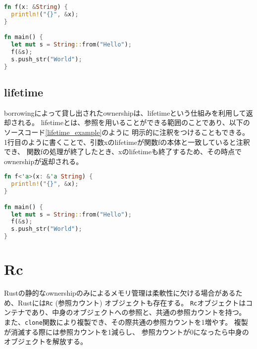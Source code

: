 \documentclass{sumiilab-paper}
\theoremstyle{mystyle}
\numberwithin{definition}{chapter} %
\begin{document}
\begin{lstlisting}[language=Rust, caption=borrowingの例, label=borrowing_example, captionpos=b]
fn f(x: &String) {
  println!("{}", &x);
}

fn main() {
  let mut s = String::from("Hello");
  f(&s);
  s.push_str("World");
}
\end{lstlisting}

\subsection{lifetime}
borrowingによって貸し出されたownershipは、lifetimeという仕組みを利用して返却される。
lifetimeとは、参照を用いることができる範囲のことであり、以下のソースコード\ref{lifetime_example}のように
明示的に注釈をつけることもできる。
1行目のように書くことで、引数xのlifetimeが関数fの本体と一致していると注釈でき、
関数fの処理が終了したとき、xのlifetimeも終了するため、その時点でownershipが返却される。
\begin{lstlisting}[language=Rust, caption=lifetime注釈, label=lifetime_example, captionpos=b]
fn f<'a>(x: &'a String) {
  println!("{}", &x);
}

fn main() {
  let mut s = String::from("Hello");
  f(&s);
  s.push_str("World");
}
\end{lstlisting}

\section{Rc}
Rustの静的なownershipのみによるメモリ管理は柔軟性に欠ける場合があるため、Rustには\texttt{Rc} (参照カウント) オブジェクトも存在する。
\texttt{Rc}オブジェクトはコンテナであり、中身のオブジェクトへの参照と、共通の参照カウントを持つ。
また、\texttt{clone}関数により複製でき、その際共通の参照カウントを1増やす。
複製が消滅する際には参照カウントを1減らし、
参照カウントが0になったら中身のオブジェクトを解放する。
\end{document}
